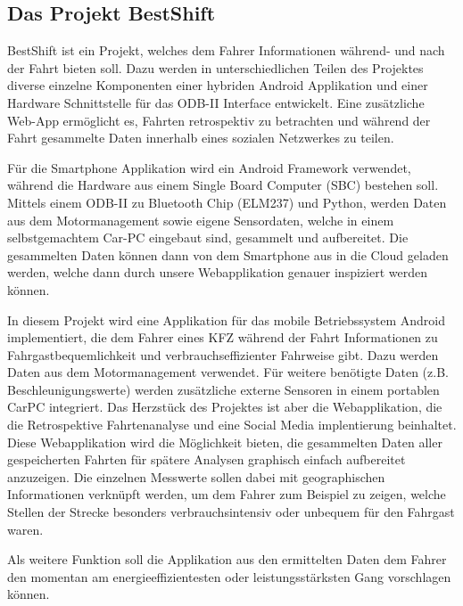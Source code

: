 \subsection{Das Projekt BestShift}

BestShift ist ein Projekt, welches dem Fahrer Informationen während- und nach der Fahrt bieten soll. 
Dazu werden in unterschiedlichen Teilen des Projektes 
diverse einzelne Komponenten einer hybriden Android Applikation und einer Hardware Schnittstelle für das ODB-II 
Interface entwickelt. 
Eine zusätzliche Web-App ermöglicht es, Fahrten retrospektiv zu betrachten und während der Fahrt gesammelte Daten innerhalb eines sozialen Netzwerkes zu teilen.
 

Für die Smartphone Applikation wird ein Android Framework verwendet, 
während die Hardware aus einem Single Board Computer (SBC) bestehen soll. 
Mittels einem ODB-II zu Bluetooth Chip (ELM237) und Python, 
werden Daten aus dem Motormanagement sowie eigene Sensordaten, welche in einem selbstgemachtem Car-PC eingebaut sind,
gesammelt und aufbereitet. 
Die gesammelten Daten können dann von dem Smartphone aus in die Cloud geladen werden, welche dann durch unsere
Webapplikation genauer inspiziert werden können.

\newline
In diesem Projekt wird eine Applikation für das mobile Betriebssystem Android implementiert, 
die dem Fahrer eines KFZ während der Fahrt Informationen zu Fahrgastbequemlichkeit und verbrauchseffizienter Fahrweise gibt. 
Dazu werden Daten aus dem Motormanagement verwendet. 
Für weitere benötigte Daten (z.B. Beschleunigungswerte) werden zusätzliche externe Sensoren in einem portablen CarPC integriert. 
Das Herzstück des Projektes ist aber die Webapplikation, die die Retrospektive Fahrtenanalyse und eine Social Media implentierung beinhaltet.
Diese Webapplikation wird die Möglichkeit bieten, die gesammelten Daten aller gespeicherten 
Fahrten für spätere Analysen graphisch einfach aufbereitet anzuzeigen. 
Die einzelnen Messwerte sollen dabei mit geographischen Informationen verknüpft werden, 
um dem Fahrer zum Beispiel zu zeigen, welche Stellen der Strecke besonders verbrauchsintensiv oder unbequem für den Fahrgast waren. 

Als weitere Funktion soll die Applikation aus den ermittelten Daten dem Fahrer den 
momentan am energieeffizientesten oder leistungsstärksten Gang vorschlagen können.
\clearpage %